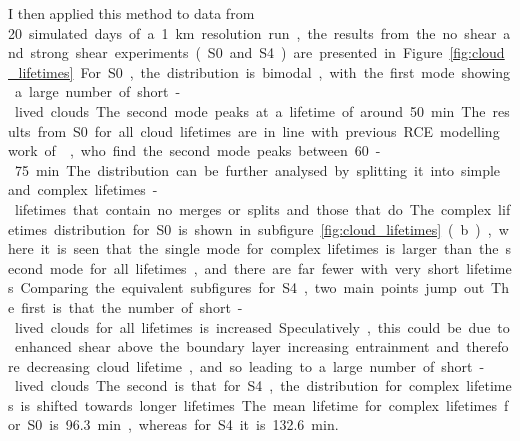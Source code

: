 \documentclass[11pt,a4paper]{article}
\begin{document}
I then applied this method to data from \SI{20} simulated days of a \SI{1}{km} resolution run, the results from the no shear and strong shear experiments (S0 and S4) are presented in Figure \ref{fig:cloud_lifetimes}. 
For S0, the distribution is bimodal, with the first mode showing a large number of short-lived clouds. The second mode peaks at a lifetime of around \SI{50}{min}. 
The results from S0 for all cloud lifetimes are in line with previous RCE modelling work of \cite{plant2009statistical}, who find the second mode peaks between \SI{60}-\SI{75}{min}.

The distribution can be further analysed by splitting it into simple and complex lifetimes - lifetimes that contain no merges or splits and those that do. The complex lifetimes distribution for S0 is shown in subfigure \ref{fig:cloud_lifetimes} (b), where it is seen that the single mode for complex lifetimes is larger than the second mode for all lifetimes, and there are far fewer with very short lifetimes. 

Comparing the equivalent subfigures for S4, two main points jump out. The first is that the number of short-lived clouds for all lifetimes is increased. Speculatively, this could be due to enhanced shear above the boundary layer increasing entrainment and therefore decreasing cloud lifetime, and so leading to a large number of short-lived clouds. The second is that for S4, the distribution for complex lifetimes is shifted towards longer lifetimes. The mean lifetime for complex lifetimes for S0 is \SI{96.3}{min}, whereas for S4 it is \SI{132.6}{min}.
\end{document}
